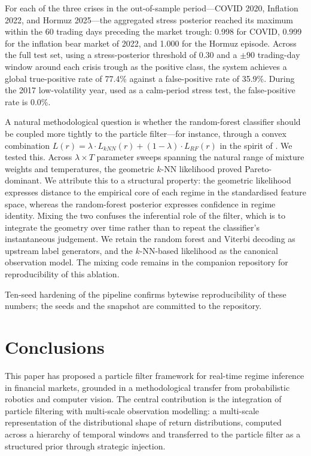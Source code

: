 \documentclass[11pt]{article}
\begin{document}
For each of the three crises in the out-of-sample period---COVID 2020,
Inflation 2022, and Hormuz 2025---the aggregated stress posterior
reached its maximum within the 60 trading days preceding the market
trough: 0.998 for COVID, 0.999 for the inflation bear market of 2022,
and 1.000 for the Hormuz episode. Across the full test set, using a
stress-posterior threshold of 0.30 and a $\pm 90$ trading-day window
around each crisis trough as the positive class, the system achieves a
global true-positive rate of 77.4\% against a false-positive rate of
35.9\%. During the 2017 low-volatility year, used as a calm-period
stress test, the false-positive rate is 0.0\%.

A natural methodological question is whether the random-forest
classifier should be coupled more tightly to the particle filter---for
instance, through a convex combination
$L(r) = \lambda \cdot L_{kNN}(r) + (1-\lambda) \cdot L_{RF}(r)$ in the
spirit of \citet{Grisetti2007}. We tested this. Across
$\lambda \times T$ parameter sweeps spanning the natural range of
mixture weights and temperatures, the geometric $k$-NN likelihood proved
Pareto-dominant. We attribute this to a structural property: the
geometric likelihood expresses distance to the empirical core of each
regime in the standardised feature space, whereas the random-forest
posterior expresses confidence in regime identity. Mixing the two
confuses the inferential role of the filter, which is to integrate the
geometry over time rather than to repeat the classifier's instantaneous
judgement. We retain the random forest and Viterbi decoding as upstream
label generators, and the $k$-NN-based likelihood as the canonical
observation model. The mixing code remains in the companion repository
for reproducibility of this ablation.

Ten-seed hardening of the pipeline confirms bytewise reproducibility of
these numbers; the seeds and the snapshot are committed to the
repository.

\section{Conclusions}

This paper has proposed a particle filter framework for real-time regime
inference in financial markets, grounded in a methodological transfer
from probabilistic robotics and computer vision. The central
contribution is the integration of particle filtering with multi-scale
observation modelling: a multi-scale representation of the distributional
shape of return distributions, computed across a hierarchy of temporal
windows and transferred to the particle filter as a structured prior
through strategic injection.
\end{document}
